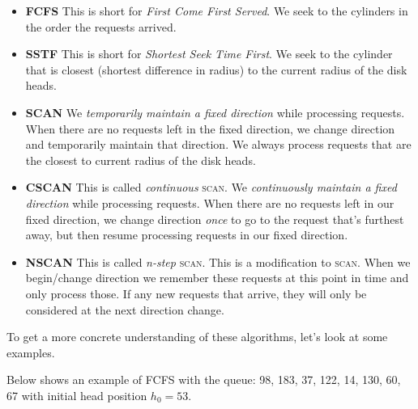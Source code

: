 \begin{itemize}   
\renewcommand{\labelitemi}{$\Box$}
\item \textbf{FCFS} 
This is short for \textit{First Come First Served}. 
We seek to the cylinders in the order the requests arrived. 
\item \textbf{SSTF}
This is short for \textit{Shortest Seek Time First}. 
We seek to the cylinder that is closest (shortest difference in radius) 
to the current radius of the disk heads. 
\item \textbf{SCAN}
We \textit{temporarily maintain a fixed direction} while processing requests. 
When there are no requests left in the fixed direction, we change direction and 
temporarily maintain that direction. 
We always process requests that are the closest to current radius of the disk heads. 
\item \textbf{CSCAN}
This is called \textit{continuous} \textsc{scan}. 
We \textit{continuously maintain a fixed direction} while processing requests.
When there are no requests left in our fixed direction,
we change direction \textit{once} to go to the request that's furthest away, 
but then resume processing requests in our fixed direction. 
\item \textbf{NSCAN}
This is called \textit{n-step} \textsc{scan}. This is a modification to \textsc{scan}.
When we begin/change direction we remember these requests at this point in time and only
process those. If any new requests that arrive, they will only be 
considered at the next direction change. 
\end{itemize}

To get a more concrete understanding of these algorithms, let's look at some examples.

\frmrule

\begin{example}
Below shows an example of FCFS with the queue: 98, 183, 37, 122, 14, 130, 60, 67
with initial head position $h_0 = 53$. 

\end{example}

